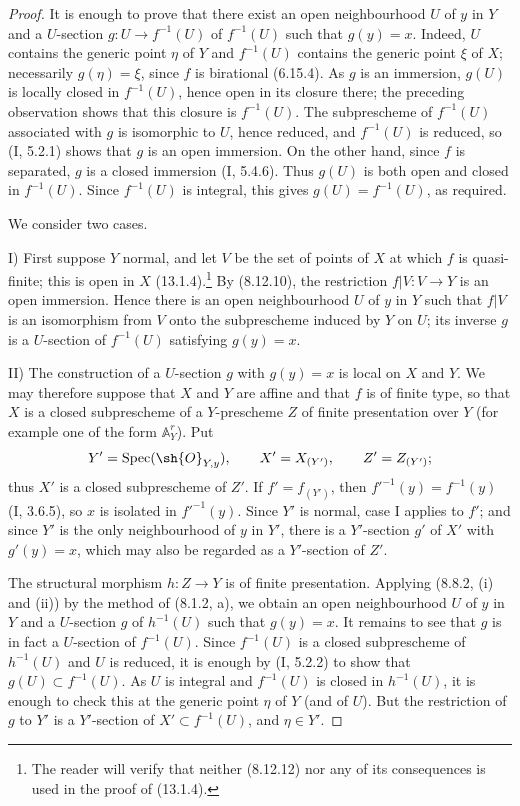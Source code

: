\begin{proof}
It is enough to prove that there exist an open neighbourhood $U$ of
$y$ in $Y$ and a $U$-section $g:U\to f^{-1}(U)$ of $f^{-1}(U)$ such
that $g(y)=x$.  Indeed, $U$ contains the generic point $\eta$ of $Y$
and $f^{-1}(U)$ contains the generic point $\xi$ of $X$; necessarily
$g(\eta)=\xi$, since $f$ is birational (6.15.4).  As $g$ is an
immersion, $g(U)$ is locally closed in $f^{-1}(U)$, hence open in its
closure there; the preceding observation shows that this closure is
$f^{-1}(U)$.  The subprescheme of $f^{-1}(U)$ associated with $g$ is
isomorphic to $U$, hence reduced, and $f^{-1}(U)$ is reduced, so (I,
5.2.1) shows that $g$ is an open immersion.  On the other hand, since
$f$ is separated, $g$ is a closed immersion (I, 5.4.6).  Thus $g(U)$
is both open and closed in $f^{-1}(U)$.  Since $f^{-1}(U)$ is integral,
this gives $g(U)=f^{-1}(U)$, as required.

We consider two cases.

\textup{I)} First suppose $Y$ normal, and let $V$ be the set of points
of $X$ at which $f$ is quasi-finite; this is open in $X$ (13.1.4).\footnote{The
reader will verify that neither (8.12.12) nor any of its consequences is
used in the proof of (13.1.4).}  By (8.12.10), the restriction
$f|V:V\to Y$ is an open immersion.  Hence there is an open
neighbourhood $U$ of $y$ in $Y$ such that $f|V$ is an isomorphism from
$V$ onto the subprescheme induced by $Y$ on $U$; its inverse $g$ is a
$U$-section of $f^{-1}(U)$ satisfying $g(y)=x$.

\textup{II)} The construction of a $U$-section $g$ with $g(y)=x$ is
local on $X$ and $Y$.  We may therefore suppose that $X$ and $Y$ are
affine and that $f$ is of finite type, so that $X$ is a closed
subprescheme of a $Y$-prescheme $Z$ of finite presentation over $Y$
(for example one of the form $\mathbb A_Y^r$).  Put
\[
 Y'=\operatorname{Spec}(\sh{O}_{Y,y}),\qquad
 X'=X_{(Y')},\qquad Z'=Z_{(Y')};
\]
thus $X'$ is a closed subprescheme of $Z'$.  If $f'=f_{(Y')}$, then
$f'^{-1}(y)=f^{-1}(y)$ (I, 3.6.5), so $x$ is isolated in
$f'^{-1}(y)$.  Since $Y'$ is normal, case I applies to $f'$; and since
$Y'$ is the only neighbourhood of $y$ in $Y'$, there is a $Y'$-section
$g'$ of $X'$ with $g'(y)=x$, which may also be regarded as a
$Y'$-section of $Z'$.

The structural morphism $h:Z\to Y$ is of finite presentation.  Applying
(8.8.2, (i) and (ii)) by the method of (8.1.2, a), we obtain an open
neighbourhood $U$ of $y$ in $Y$ and a $U$-section $g$ of $h^{-1}(U)$
such that $g(y)=x$.  It remains to see that $g$ is in fact a $U$-section
of $f^{-1}(U)$.  Since $f^{-1}(U)$ is a closed subprescheme of
$h^{-1}(U)$ and $U$ is reduced, it is enough by (I, 5.2.2) to show that
$g(U)\subset f^{-1}(U)$.  As $U$ is integral and $f^{-1}(U)$ is closed
in $h^{-1}(U)$, it is enough to check this at the generic point $\eta$
of $Y$ (and of $U$).  But the restriction of $g$ to $Y'$ is a
$Y'$-section of $X'\subset f^{-1}(U)$, and $\eta\in Y'$.
\end{proof}

